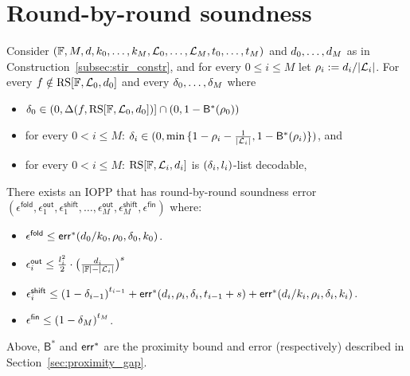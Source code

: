 \section{Round-by-round soundness}\label{sec:rnd_by_rnd_soundness}
\lean{}
\leanok{}
\begin{lemma}\label{lemma:rnd_by_rnd_soundness}
    Consider $(\mathbb{F},M,d,k_0,\ldots,k_M,\mathcal{L}_0,\ldots,\mathcal{L}_M,t_0,\ldots,t_M)$ and $d_0,\ldots,d_M$ as in Construction~\ref{subsec:stir_constr}, and for every $0\leq i\leq M$ let $\rho_i:=d_i/|\mathcal{L}_i|$. For every $f\notin\mathrm{RS}[\mathbb{F},\mathcal{L}_0,d_0]$ and every $\delta_0,\ldots,\delta_M$ where
    \begin{itemize}
        \item $\delta_0\in(0,\Delta(f,\mathrm{RS}[\mathbb{F},\mathcal{L}_0,d_0])]\cap(0,1-{\mathsf{B}}^*(\rho_0))$
        \item for every $0<i\leq M$: $\delta_i\in(0,\min{\{1-\rho_i-\frac{1}{|\mathcal{L}_i|},1-{\mathsf{B}^*(\rho_i)}\}})$, and
        \item for every $0<i\leq M$: $\mathrm{RS}[\mathbb{F},\mathcal{L}_i,d_i]$ is $(\delta_i,l_i)$-list decodable,
    \end{itemize}
    There exists an IOPP that has round-by-round soundness error $(\epsilon^{\mathsf{fold}},\epsilon^{\mathsf{out}}_1,\epsilon^{\mathsf{shift}}_1,\ldots,\epsilon^{\mathsf{out}}_M,\epsilon^{\mathsf{shift}}_M,\epsilon^{\mathsf{fin}})$ where:
    \begin{itemize}
        \item $\epsilon^{\mathsf{fold}}\leq\mathsf{err}^*(d_0/k_0,\rho_0,\delta_0,k_0)$.
        \item $\epsilon^{\mathsf{out}}_i\leq\frac{l^2_i}{2}\cdot{\big(\frac{d_i}{|\mathbb{F}|-|\mathcal{L}_i|}\big)}^s$
        \item $\epsilon^{\mathsf{shift}}_i\leq {(1-\delta_{i-1})}^{t_{i-1}}+\mathsf{err}^*(d_i,\rho_i,\delta_i,t_{i-1}+s)+\mathsf{err}^*(d_i/k_i,\rho_i,\delta_i,k_i)$.
        \item $\epsilon^{\mathsf{fin}}\leq{(1-\delta_M)}^{t_M}$.
    \end{itemize}
    Above, ${\mathsf{B}}^*$ and ${\mathsf{err}}^*$ are the proximity bound and error (respectively) described in Section~\ref{sec:proximity_gap}.
\end{lemma}